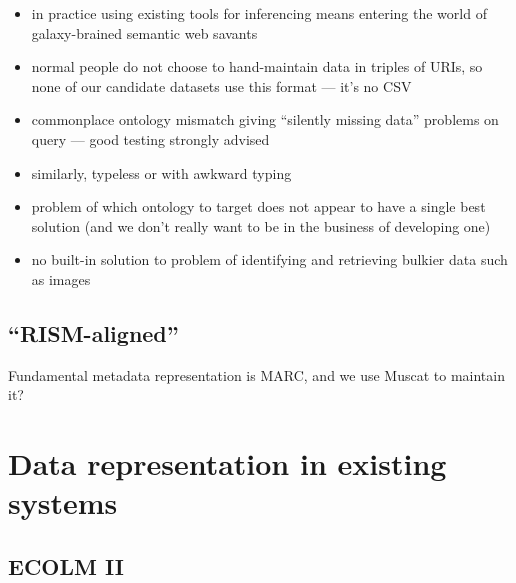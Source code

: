 \documentclass[sigconf]{acmart}
\begin{document}
\begin{sloppypar}
  \begin{itemize}
    \item in practice using existing tools for inferencing means
      entering the world of galaxy-brained semantic web savants
    \item normal people do not choose to hand-maintain data in triples
      of URIs, so none of our candidate datasets use this format ---
      it's no CSV
    \item commonplace ontology mismatch giving ``silently missing
      data'' problems on query --- good testing strongly advised
    \item similarly, typeless or with awkward typing
    \item problem of which ontology to target does not appear to have
      a single best solution (and we don't really want to be in the
      business of developing one)
    \item no built-in solution to problem of identifying and
      retrieving bulkier data such as images
  \end{itemize}

  \subsection{``RISM-aligned''}

  Fundamental metadata representation is MARC, and we use Muscat to
  maintain it? 
  
  \clearpage

  \section{Data representation in existing systems}
  
  \subsection{ECOLM II}\label{ecolm-data}
  

\end{sloppypar}
\end{document}
